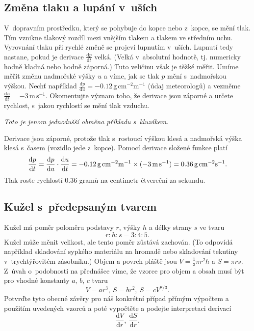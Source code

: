 \konec


 \subsection{Změna tlaku a lupání v uších}
V dopravním prostředku, který se pohybuje do kopce nebo z kopce, se
mění tlak. Tím vznikne tlakový rozdíl mezi vnějším tlakem a tlakem ve
středním uchu. Vyrovnání tlaku při rychlé změně se projeví lupnutím
v uších.  Lupnutí tedy nastane, pokud je derivace
$\frac {\mathrm d p}{\mathrm dt}$ velká. (Velká v absolutní hodnotě,
tj. numericky hodně kladná nebo hodně záporná.)  Tuto veličinu však je
těžké měřit. Umíme měřit změnu nadmořské výšky $u$ a víme, jak se tlak
$p$ mění s nadmořskou výškou. Nechť například
$\frac{\mathrm dp}{\mathrm
  du}=-0.12\,\mathrm{g}\,\mathrm{cm}^{-2}\mathrm{m}^{-1}$ (údaj
meteorologů) a vezměme
$ \frac{\mathrm du}{\mathrm
  dt}=-3\,\mathrm{m}\,\mathrm{s}^{-1}$. Okomentujte význam toho, že
derivace jsou záporné a určete rychlost, s jakou rychlostí se mění
tlak vzduchu.

\textit{Toto je jenom jednodušší obměna příkladu s kluzákem.}

\reseni Derivace jsou záporné, protože tlak s rostoucí výškou klesá a
nadmořská výška klesá s časem (vozidlo jede z kopce).
Pomocí derivace složené funkce platí
$$\frac{\mathrm{d}p}{\mathrm{d}t}=\frac{\mathrm{d}p}{\mathrm{d}u} \cdot \frac{\mathrm{d}u}{\mathrm{d}t}=-0.12
\,\mathrm{g}\,\mathrm{cm}^{-2}\mathrm{m}^{-1}\times
(-3\,\mathrm{m}\,\mathrm{s}^{-1})
=0.36 \,\mathrm{g}\,\mathrm{cm}^{-2}\mathrm{s}^{-1}.
$$
Tlak roste rychlostí $0.36$ gramů na centimetr čtvereční za sekundu.
\konec


\stranka

\subsection{Kužel s předepsaným tvarem}
\label{kuzel}

Kužel má poměr poloměru podstavy $r$, výšky $h$ a délky strany $s$ ve tvaru $$r:h:s=3:4:5.$$ Kužel může měnit velikost, ale tento poměr zůstává zachován. (To odpovídá například skladování sypkého materiálu na hromadě nebo skladování tekutiny v trychtýřovitém zásobníku.) Objem a povrch pláště jsou $V=\frac 13 \pi r^2 h$ a $S=\pi rs$. Z úvah o podobnosti na přednášce víme, že vzorce pro objem a obsah musí být pro vhodné konstanty $a$, $b$, $c$ tvaru
$$V=ar^3,\ S=br^2,\ S=cV^{2/3}.$$
Potvrďte tyto obecné závěry pro náš konkrétní případ přímým výpočtem a použitím uvedených vzorců a poté vypočtěte a podejte interpretaci derivací $$\frac{\mathrm dV}{\mathrm dr},\ \frac{\mathrm dS}{\mathrm dr}.$$

